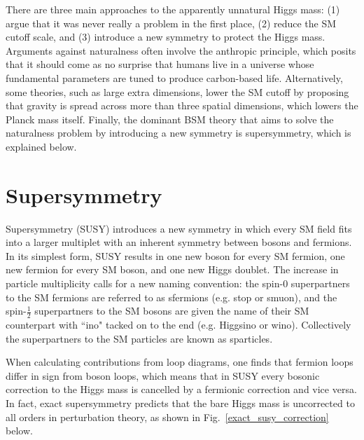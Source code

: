 \documentclass[12pt]{article}
\begin{document}
     There are three main approaches to the apparently unnatural Higgs mass: (1) argue that it was never really a problem in the first place, (2) reduce the SM cutoff scale, and (3) introduce a new symmetry to protect the Higgs mass. Arguments against naturalness often involve the anthropic principle, which posits that it should come as no surprise that humans live in a universe whose fundamental parameters are tuned to produce carbon-based life. Alternatively, some theories, such as large extra dimensions, lower the SM cutoff by proposing that gravity is spread across more than three spatial dimensions, which lowers the Planck mass itself. Finally, the dominant BSM theory that aims to solve the naturalness problem by introducing a new symmetry is supersymmetry, which is explained below.
    
\section{Supersymmetry}
    Supersymmetry (SUSY) introduces a new symmetry in which every SM field fits into a larger multiplet with an inherent symmetry between bosons and fermions. In its simplest form, SUSY results in one new boson for every SM fermion, one new fermion for every SM boson, and one new Higgs doublet. The increase in particle multiplicity calls for a new naming convention: the spin-0 superpartners to the SM fermions are referred to as sfermions (e.g. stop or smuon), and the spin-$\frac{1}{2}$ superpartners to the SM bosons are given the name of their SM counterpart with ``ino" tacked on to the end (e.g. Higgsino or wino). Collectively the superpartners to the SM particles are known as sparticles.  

    When calculating contributions from loop diagrams, one finds that fermion loops differ in sign from boson loops, which means that in SUSY every bosonic correction to the Higgs mass is cancelled by a fermionic correction and vice versa. In fact, exact supersymmetry predicts that the bare Higgs mass is uncorrected to all orders in perturbation theory, as shown in Fig.~\ref{exact_susy_correction} below.
    
\end{document}
